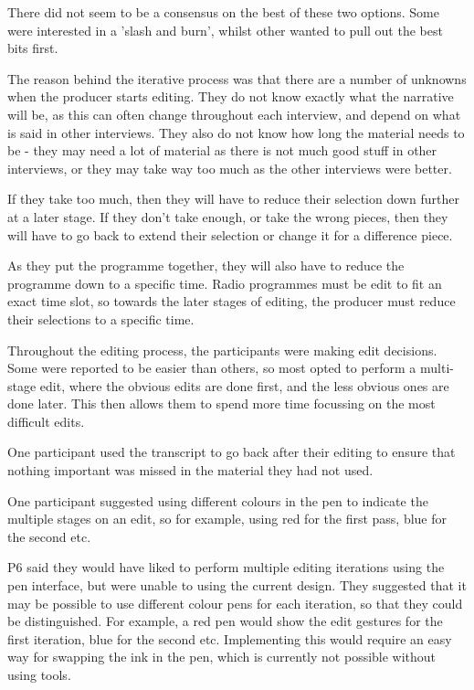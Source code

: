 There did not seem to be a consensus on the best of these two options. Some were interested in a 'slash and burn',
whilst other wanted to pull out the best bits first.

The reason behind the iterative process was that there are a number of unknowns when the producer starts editing. They
do not know exactly what the narrative will be, as this can often change throughout each interview, and depend on what
is said in other interviews. They also do not know how long the material needs to be - they may need a lot of material
as there is not much good stuff in other interviews, or they may take way too much as the other interviews were better.

If they take too much, then they will have to reduce their selection down further at a later stage. If they don't take
enough, or take the wrong pieces, then they will have to go back to extend their selection or change it for a
difference piece.

As they put the programme together, they will also have to reduce the programme down to a specific time. Radio
programmes must be edit to fit an exact time slot, so towards the later stages of editing, the producer must reduce
their selections to a specific time.

Throughout the editing process, the participants were making edit decisions. Some were reported to be easier than
others, so most opted to perform a multi-stage edit, where the obvious edits are done first, and the less obvious ones
are done later. This then allows them to spend more time focussing on the most difficult edits.

One participant used the transcript to go back after their editing to ensure that nothing important was missed in the
material they had not used.

One participant suggested using different colours in the pen to indicate the multiple stages on an edit, so for
example, using red for the first pass, blue for the second etc.

P6 said they would have liked to perform multiple editing iterations using the pen interface, but were unable to using
the current design. They suggested that it may be possible to use different colour pens for each iteration, so that
they could be distinguished. For example, a red pen would show the edit gestures for the first iteration, blue for the
second etc. Implementing this would require an easy way for swapping the ink in the pen, which is currently not
possible without using tools.


